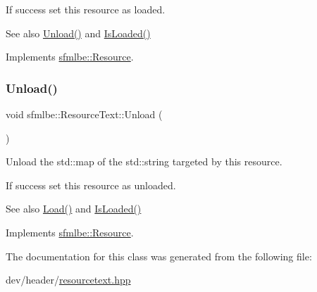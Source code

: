 If success set this resource as loaded. \begin{DoxySeeAlso}{See also}
\mbox{\hyperlink{classsfmlbe_1_1_resource_text_a7493d044dfcd376b0fd17fd5fbd52ada}{Unload()}} and \mbox{\hyperlink{classsfmlbe_1_1_resource_acd0812c81f7d5d851a4671f0cf7bb4f1}{Is\+Loaded()}} 
\end{DoxySeeAlso}


Implements \mbox{\hyperlink{classsfmlbe_1_1_resource_a35981869a1e90ebbf30258ff7aa1d6d2}{sfmlbe\+::\+Resource}}.

\mbox{\label{classsfmlbe_1_1_resource_text_a7493d044dfcd376b0fd17fd5fbd52ada}} 
\subsubsection{\texorpdfstring{Unload()}{Unload()}}
{\footnotesize\ttfamily void sfmlbe\+::\+Resource\+Text\+::\+Unload (\begin{DoxyParamCaption}{ }\end{DoxyParamCaption})\hspace{0.3cm}{\ttfamily [virtual]}}



Unload the std\+::map of the std\+::string targeted by this resource. 

If success set this resource as unloaded. \begin{DoxySeeAlso}{See also}
\mbox{\hyperlink{classsfmlbe_1_1_resource_text_a1176965f3e9d26c618688f7899b4b58b}{Load()}} and \mbox{\hyperlink{classsfmlbe_1_1_resource_acd0812c81f7d5d851a4671f0cf7bb4f1}{Is\+Loaded()}} 
\end{DoxySeeAlso}


Implements \mbox{\hyperlink{classsfmlbe_1_1_resource_a48c75a88679cf457965dd013f47014b9}{sfmlbe\+::\+Resource}}.



The documentation for this class was generated from the following file\+:\begin{DoxyCompactItemize}
\item 
dev/header/\mbox{\hyperlink{resourcetext_8hpp}{resourcetext.\+hpp}}\end{DoxyCompactItemize}
